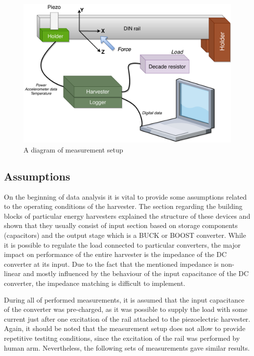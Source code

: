 \documentclass[12pt,a4paper]{article}
\begin{document}
\begin{figure}[ht!]
\includegraphics[scale=0.7]{setup.pdf}
\caption{A diagram of measurement setup}
\label{fig:setup}
\end{figure}

\par

\subsection{Assumptions}

On the beginning of data analysis it is vital to provide some assumptions related to the operating conditions of the harvester. The section regarding the building blocks of particular energy harvesters explained the structure of these devices and shown that they usually consist of input section based on storage components (capacitors) and the output stage which is a BUCK or BOOST converter. While it is possible to regulate the load connected to particular converters, the major impact on performance of the entire harvester is the impedance of the DC converter at its input. Due to the fact that the mentioned impedance is non-linear and mostly influenced by the behaviour of the input capacitance of the DC converter, the impedance matching is difficult to implement.\par

During all of performed measurements, it is assumed that the input capacitance of the converter was pre-charged, as it was possible to supply the load with some current just after one excitation of the rail attached to the piezoelectric harvester. Again, it should be noted that the measurement setup does not allow to provide repetitive testitng conditions, since the excitation of the rail was performed by human arm. Nevertheless, the following sets of measurements gave similar results.
\end{document}
